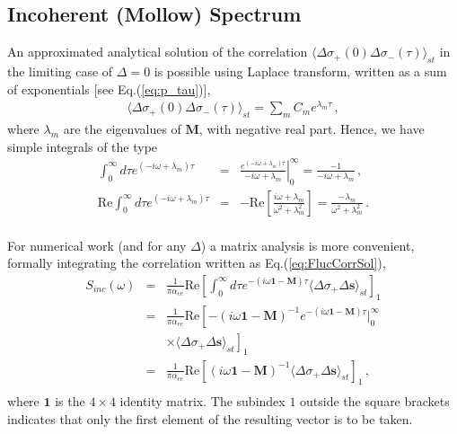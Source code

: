 \documentclass[twocolumn,aps,eqsecnum,showkeys,amsmath]{revtex4-2}
\begin{document}
\subsection{Incoherent (Mollow) Spectrum} 
An approximated analytical solution of the correlation 
$\langle \Delta \sigma_+(0) \Delta \sigma_-(\tau) \rangle_{st}$ in the 
limiting case of $\Delta =0$ is possible using Laplace transform, written 
as a sum of exponentials [see Eq.(\ref{eq:p_tau})],
%
\begin{eqnarray}
\langle \Delta \sigma_+(0) \Delta \sigma_-(\tau) \rangle_{st} 
	= \sum_m C_m e^{\lambda_m \tau} \,, 
\end{eqnarray}
where $\lambda_m$ are the eigenvalues of $\mathbf{M}$, with negative 
real part. Hence, we have simple integrals of the type
%
\begin{eqnarray} 	%
\int_0^{\infty} d\tau e^{(-i \omega +\lambda_m) \tau} 
	&=& \left. \frac{e^{(-i \omega +\lambda_m) \tau}}
	{-i \omega +\lambda_m} \right|_0^{\infty} 
	= \frac{-1}{-i \omega +\lambda_m} \,,	\nonumber 	\\ 
\mathrm{Re} \int_0^{\infty} d\tau e^{(-i \omega +\lambda_m) \tau} 
	&=& - \mathrm{Re} \left[ \frac{i \omega +\lambda_m}
	{ \omega^2 +\lambda_m^2} \right] 
	= \frac{- \lambda_m}{ \omega^2 +\lambda_m^2} \,. \nonumber \\
\end{eqnarray}

For numerical work (and for any $\Delta$) a matrix analysis is more 
convenient, formally integrating the correlation written as
Eq.(\ref{eq:FlucCorrSol}), 
%
\begin{eqnarray} 	%
S_{inc}(\omega) 
&=& \frac{1}{ \pi \alpha_{ee}  } \mathrm{Re} \left[  \int_0^{\infty} 
	d\tau e^{-(i \omega \mathbf{1} -\mathbf{M}) \tau} 	
	\langle \Delta \sigma_+ \Delta \mathbf{s} \rangle_{st} \right]_1   
	\nonumber \\ 
&=& \frac{1}{ \pi \alpha_{ee}  } \mathrm{Re} \left[ 
	-(i \omega \mathbf{1} -\mathbf{M})^{-1} 
	e^{-(i \omega \mathbf{1} -\mathbf{M}) \tau} \left. \right|_0^{\infty}  
	 \right. 	\nonumber \\
&&	\left. \times 
	\langle \Delta \sigma_+ \Delta \mathbf{s} \rangle_{st} \right]_1 	
	\nonumber \\ 
&=& \frac{1}{ \pi \alpha_{ee}  } \mathrm{Re} \left[ 
	(i \omega \mathbf{1} -\mathbf{M})^{-1} 
	\langle \Delta \sigma_+ \Delta \mathbf{s} \rangle_{st} \right]_1 	\,, 	
	\nonumber \\ 
\end{eqnarray}
where $\mathbf{1}$ is the $4 \times 4$ identity matrix. The subindex $1$ 
outside the square brackets indicates that only the first element of the 
resulting vector is to be taken.
\end{document}
